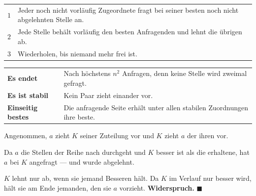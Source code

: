 \begin{merksatz}
\begin{center}
{\small
\renewcommand{\arraystretch}{1.5}
\begin{tabular}{@{}P{1.0cm}P{7.4cm}@{}}
\toprule
$1$ & Jeder noch nicht vorläufig Zugeordnete fragt bei seiner besten noch nicht abgelehnten Stelle an.\\
$2$ & Jede Stelle behält vorläufig den besten Anfragenden und lehnt die übrigen ab.\\
$3$ & Wiederholen, bis niemand mehr frei ist.\\
\bottomrule
\end{tabular}}
\end{center}

\begin{center}
{\small
\renewcommand{\arraystretch}{1.52}
\begin{tabular}{@{}P{2.4cm}P{6.2cm}@{}}
\toprule
\textbf{Es endet} & Nach höchstens $n^{2}$ Anfragen, denn keine Stelle wird zweimal gefragt.\\
\textbf{Es ist stabil} & Kein Paar zieht einander vor.\\
\textbf{Einseitig bestes} & Die anfragende Seite erhält unter allen stabilen Zuordnungen ihre beste.\\
\bottomrule
\end{tabular}}
\end{center}

Angenommen, $a$ zieht $K$ seiner Zuteilung vor und $K$ zieht $a$ der ihren vor.

Da $a$ die Stellen der Reihe nach durchgeht und $K$ besser ist als die erhaltene, hat $a$ bei $K$ angefragt --- und wurde abgelehnt.

$K$ lehnt nur ab, wenn sie jemand Besseren hält. Da $K$ im Verlauf nur besser wird, hält sie am Ende jemanden, den sie $a$ vorzieht. \textbf{Widerspruch.} $\blacksquare$
\end{merksatz}

